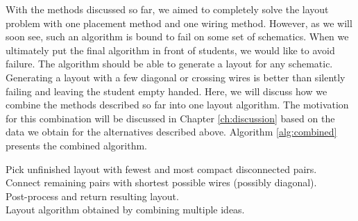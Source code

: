 With the methods discussed so far, we aimed to completely solve the layout problem
with one placement method and one wiring method. However, as we will soon see,
such an algorithm is bound to fail on some set of schematics. When we ultimately
put the final algorithm in front of students, we would like to avoid failure.
The algorithm should be able to generate a layout for any schematic.
Generating a layout
with a few diagonal or crossing wires is better than silently failing and leaving
the student empty handed. Here, we will discuss how we combine the methods
described so far into one layout algorithm. The motivation for this combination
will be discussed in Chapter \ref{ch:discussion} based on the data we obtain
for the alternatives described above. Algorithm \ref{alg:combined} presents the
combined algorithm.

\begin{algorithm}
\BlankLine
{}
Pick unfinished layout with fewest and most compact disconnected pairs.\\
Connect remaining pairs with shortest possible wires (possibly diagonal).\\
Post-process and return resulting layout.\\
\caption{Layout algorithm obtained by combining multiple ideas.}
\label{alg:combined}
\end{algorithm}

